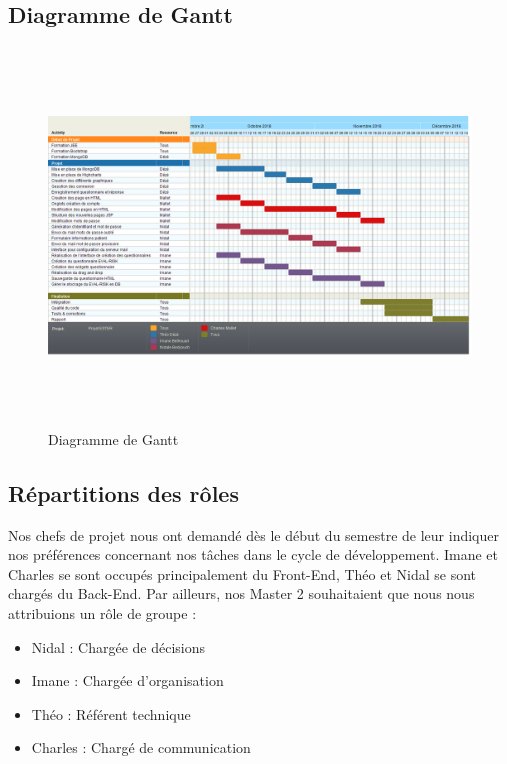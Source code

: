 \subsection{Diagramme de Gantt}

\begin{figure}[H]
    \begin{center}
    \includegraphics[height=10.0cm]{img/gantt}
    \end{center}
    \caption{Diagramme de Gantt}
\end{figure}

\subsection{Répartitions des rôles}

Nos chefs de projet nous ont demandé dès le début du semestre de leur indiquer nos préférences concernant nos tâches dans le cycle de développement. Imane et Charles se sont occupés principalement du Front-End, Théo et Nidal se sont chargés du Back-End.
Par ailleurs, nos Master 2 souhaitaient que nous nous attribuions un rôle de groupe : 

\begin{itemize}
\item Nidal : Chargée de décisions
\item Imane : Chargée d'organisation
\item Théo : Référent technique
\item Charles : Chargé de communication
\end{itemize}
